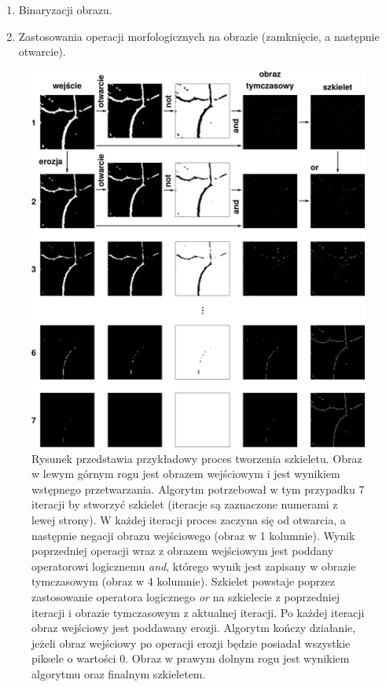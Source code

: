 \begin{enumerate}
\item Binaryzacji obrazu.
\item Zastosowania operacji morfologicznych na obrazie (zamknięcie, a następnie otwarcie).
\end{enumerate}

\begin{figure}[H]
  \centering
  \includegraphics[width=\textwidth]{gfx/skeleton}
  \caption{Rysunek przedstawia przykładowy proces tworzenia szkieletu. Obraz w lewym górnym rogu jest obrazem wejściowym i jest wynikiem wstępnego przetwarzania. Algorytm potrzebował w tym przypadku 7 iteracji by stworzyć szkielet (iteracje są zaznaczone numerami z lewej strony). W każdej iteracji proces zaczyna się od otwarcia, a następnie negacji obrazu wejściowego (obraz w 1 kolumnie). Wynik poprzedniej operacji wraz z obrazem wejściowym jest poddany operatorowi logicznemu \textit{and}, którego wynik jest zapisany w obrazie tymczasowym (obraz w 4 kolumnie). Szkielet powstaje poprzez zastosowanie operatora logicznego \textit{or} na szkielecie z poprzedniej iteracji i obrazie tymczasowym z aktualnej iteracji. Po każdej iteracji obraz wejściowy jest poddawany erozji. Algorytm kończy działanie, jeżeli obraz wejściowy po operacji erozji będzie posiadał wszystkie piksele o wartości 0. Obraz w prawym dolnym rogu jest wynikiem algorytmu oraz finalnym szkieletem.}
  \label{fig:proponowane_algorytmy:skeleton}
\end{figure}

